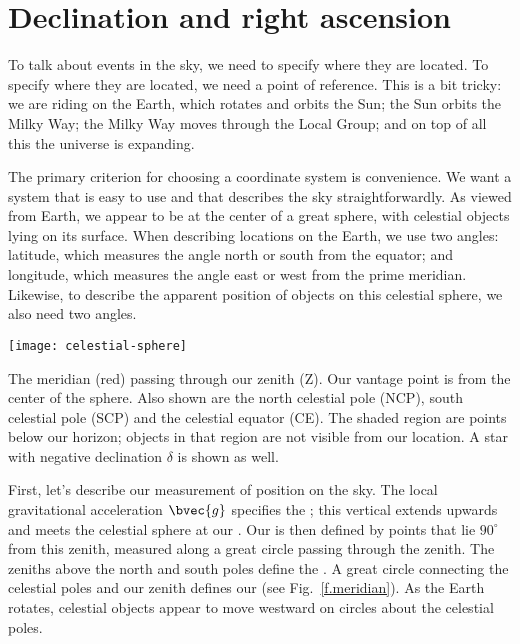 
\section{Declination and right ascension}
To talk about events in the sky, we need to specify where they are located. To specify where they are located, we need a point of reference.  This is a bit tricky: we are riding on the Earth, which rotates and orbits the Sun; the Sun orbits the Milky Way; the Milky Way moves through the Local Group; and on top of all this the universe is expanding.

The primary criterion for choosing a coordinate system is convenience. We want a system that is easy to use and that describes the sky straightforwardly.
As viewed from Earth, we appear to be at the center of a great sphere, with celestial objects lying on its surface. When describing locations on the Earth, we use two angles: latitude, which measures the angle north or south from the equator; and longitude, which measures the angle east or west from the prime meridian. Likewise, to describe the apparent position of objects on this celestial sphere, we also need two angles.

\begin{marginfigure}
\texttt{[image: celestial-sphere]}
\caption[The celestial sphere]{The meridian (red) passing through our zenith (Z).  Our vantage point is from the center of the sphere. Also shown are the north celestial pole (NCP), south celestial pole (SCP) and the celestial equator (CE).  The shaded region are points below our horizon; objects in that region are not visible from our location. A star with negative declination $\delta$ is shown as well.}
\label{f.meridian}
\end{marginfigure}

First, let's describe our measurement of position on the sky.
The local gravitational acceleration $\bvec{g}$ specifies the ; this vertical extends upwards and meets the celestial sphere at our .  Our  is then defined by points that lie $90^{\circ}$ from this zenith, measured along a great circle passing through the zenith.  The zeniths above the north and south poles define the .  A great circle connecting the celestial poles and our zenith defines our  (see Fig.~\ref{f.meridian}).  As the Earth rotates, celestial objects appear to move westward on circles about the celestial poles.  

